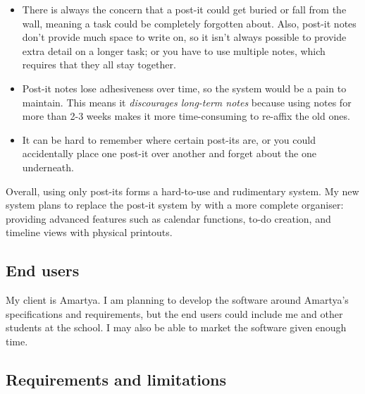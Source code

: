 \begin{itemize}

  \item There is always the concern that a post-it could get buried or fall
        from the wall, meaning a task could be completely forgotten about.
        Also, post-it notes don't provide much space to write on, so it isn't
        always possible to provide extra detail on a longer task; or you have to
        use multiple notes, which requires that they all stay together.
  \item Post-it notes lose adhesiveness over time, so the system would be a pain
        to maintain. This means it \textit{discourages long-term notes} because
        using notes for more than 2-3 weeks makes it more time-consuming to
        re-affix the old ones.
  \item It can be hard to remember where certain post-its are, or you could
        accidentally place one post-it over another and forget about the one
        underneath.

\end{itemize}

Overall, using only post-its forms a hard-to-use and rudimentary system. My new
system plans to replace the post-it system by with a more complete organiser:
providing advanced features such as calendar functions, to-do creation, and
timeline views with physical printouts.


\subsection{End users}

My client is Amartya. I am planning to develop the software around Amartya's
specifications and requirements, but the end users could include me and other
students at the school. I may also be able to market the software given enough
time.


\subsection{Requirements and limitations}

